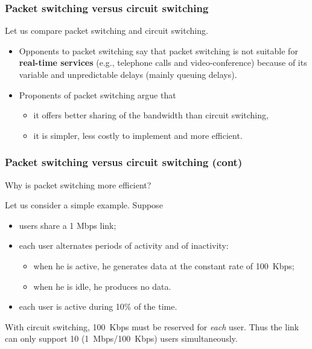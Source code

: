%
\begin{frame}
\frametitle{Packet switching versus circuit switching}

Let us compare packet switching and circuit switching.

\begin{itemize}

  \item Opponents to packet switching say that packet switching is
  not suitable for \textbf{real-time services} (e.g., telephone calls
  and video-conference) because of its variable and unpredictable
  delays (mainly queuing delays).

  \item Proponents of packet switching argue that
  
  \begin{itemize}

    \item it offers better sharing of the bandwidth than circuit
    switching,

    \item it is simpler, less costly to implement and more efficient.

  \end{itemize}

\end{itemize}

\end{frame}

%
\begin{frame}
\frametitle{Packet switching versus circuit switching (cont)}

Why is packet switching more efficient?

\bigskip

Let us consider a simple example. Suppose
\begin{itemize}

  \item users share a 1 Mbps link;

  \item each user alternates periods of activity and of inactivity:
  
   \begin{itemize}

     \item when he is active, he generates data at the constant rate
     of 100~Kbps;

     \item when he is idle, he produces no data.

   \end{itemize}

  \item each user is active during 10\% of the time.

\end{itemize}
With circuit switching, 100~Kbps must be reserved for \emph{each}
user. Thus the link can only support 10 (1~Mbps/100~Kbps) users
simultaneously.

\end{frame}

